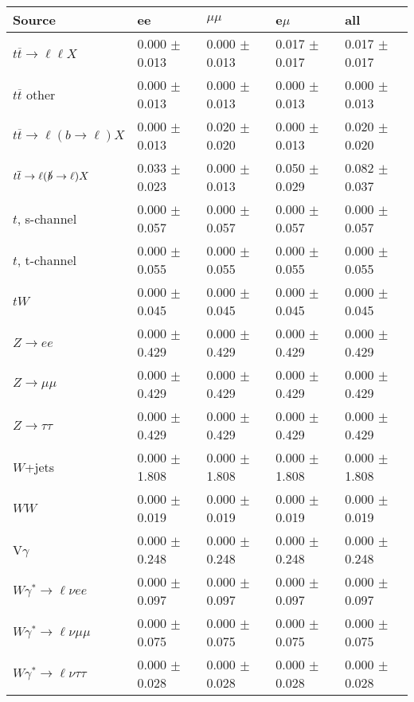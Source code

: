 \begin{tabular}{l | l l l l}
\hline\hline
 Source  &  ee  &  $\mu\mu$  &  e$\mu$  &  all \\
\hline
$t\overline{t}\rightarrow \ell\ell X$ &  0.000 $\pm$  0.013 &  0.000 $\pm$  0.013 &  0.017 $\pm$  0.017 &  0.017 $\pm$  0.017\\
$t\overline{t}$ other &  0.000 $\pm$  0.013 &  0.000 $\pm$  0.013 &  0.000 $\pm$  0.013 &  0.000 $\pm$  0.013\\
$t\overline{t}\rightarrow \ell(b\rightarrow \ell)X$ &  0.000 $\pm$  0.013 &  0.020 $\pm$  0.020 &  0.000 $\pm$  0.013 &  0.020 $\pm$  0.020\\
$t\overline{t}\rightarrow \ell(\slashed{b}\rightarrow \ell)X$ &  0.033 $\pm$  0.023 &  0.000 $\pm$  0.013 &  0.050 $\pm$  0.029 &  0.082 $\pm$  0.037\\
\hline
$t$, s-channel &  0.000 $\pm$  0.057 &  0.000 $\pm$  0.057 &  0.000 $\pm$  0.057 &  0.000 $\pm$  0.057\\
$t$, t-channel &  0.000 $\pm$  0.055 &  0.000 $\pm$  0.055 &  0.000 $\pm$  0.055 &  0.000 $\pm$  0.055\\
$tW$ &  0.000 $\pm$  0.045 &  0.000 $\pm$  0.045 &  0.000 $\pm$  0.045 &  0.000 $\pm$  0.045\\
\hline
$Z\rightarrow ee$ &  0.000 $\pm$  0.429 &  0.000 $\pm$  0.429 &  0.000 $\pm$  0.429 &  0.000 $\pm$  0.429\\
$Z\rightarrow\mu\mu$ &  0.000 $\pm$  0.429 &  0.000 $\pm$  0.429 &  0.000 $\pm$  0.429 &  0.000 $\pm$  0.429\\
$Z\rightarrow\tau\tau$ &  0.000 $\pm$  0.429 &  0.000 $\pm$  0.429 &  0.000 $\pm$  0.429 &  0.000 $\pm$  0.429\\
$W$+jets &  0.000 $\pm$  1.808 &  0.000 $\pm$  1.808 &  0.000 $\pm$  1.808 &  0.000 $\pm$  1.808\\
$WW$ &  0.000 $\pm$  0.019 &  0.000 $\pm$  0.019 &  0.000 $\pm$  0.019 &  0.000 $\pm$  0.019\\
\hline
V$\gamma$ &  0.000 $\pm$  0.248 &  0.000 $\pm$  0.248 &  0.000 $\pm$  0.248 &  0.000 $\pm$  0.248\\
$W\gamma^{*}\rightarrow\ell\nu e e$ &  0.000 $\pm$  0.097 &  0.000 $\pm$  0.097 &  0.000 $\pm$  0.097 &  0.000 $\pm$  0.097\\
$W\gamma^{*}\rightarrow\ell\nu\mu\mu$ &  0.000 $\pm$  0.075 &  0.000 $\pm$  0.075 &  0.000 $\pm$  0.075 &  0.000 $\pm$  0.075\\
$W\gamma^{*}\rightarrow\ell\nu\tau\tau$ &  0.000 $\pm$  0.028 &  0.000 $\pm$  0.028 &  0.000 $\pm$  0.028 &  0.000 $\pm$  0.028\\

\end{tabular}

